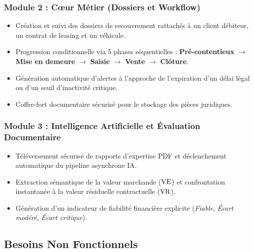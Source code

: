 \subsubsection{Module 2 : Cœur Métier (Dossiers et Workflow)}
\begin{itemize}
    \item Création et suivi des dossiers de recouvrement rattachés à un client débiteur, un contrat de leasing et un véhicule.
    \item Progression conditionnelle via 5 phases séquentielles : \textbf{Pré-contentieux} $\rightarrow$ \textbf{Mise en demeure} $\rightarrow$ \textbf{Saisie} $\rightarrow$ \textbf{Vente} $\rightarrow$ \textbf{Clôture}.
    \item Génération automatique d'alertes à l'approche de l'expiration d'un délai légal ou d'un seuil d'inactivité critique.
    \item Coffre-fort documentaire sécurisé pour le stockage des pièces juridiques.
\end{itemize}

\subsubsection{Module 3 : Intelligence Artificielle et Évaluation Documentaire}
\begin{itemize}
    \item Téléversement sécurisé de rapports d'expertise PDF et déclenchement automatique du pipeline asynchrone IA.
    \item Extraction sémantique de la valeur marchande ($\text{VE}$) et confrontation instantanée à la valeur résiduelle contractuelle ($\text{VR}$).
    \item Génération d'un indicateur de fiabilité financière explicite (\textit{Fiable}, \textit{Écart modéré}, \textit{Écart critique}).
\end{itemize}

\subsection{Besoins Non Fonctionnels}

